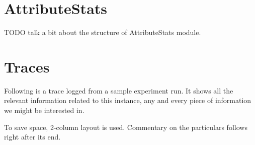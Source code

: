 \documentclass[a4paper,12pt,oneside]{report}
\begin{document}
\chapter{AttributeStats}
\label{attrstats}

TODO talk a bit about the structure of AttributeStats module.

\chapter{Traces}
\label{traces}

Following is a trace logged from a sample experiment run. It shows all the relevant information related to this instance, any and every piece of information we might be interested in.

To save space, 2-column layout is used. Commentary on the particulars follows right after its end.
\end{document}

